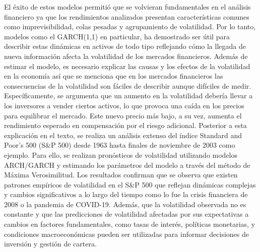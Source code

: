 \documentclass{article}
\theoremstyle{remark}
\theoremstyle{definition}
\begin{document}
\begin{enumerate}[label = \emph{\alph*})]
\begin{tcolorbox}[title=Soluci\'on 1.a]
            El éxito de estos modelos permitió que se volvieran fundamentales en el análisis financiero ya que los rendimientos analizados presentan características comunes como imprevisibilidad, colas pesadas y agrupamiento de volatilidad. Por lo tanto, modelos como el GARCH(1,1) en particular, ha demostrado ser útil para describir estas dinámicas en activos de todo tipo reflejando cómo la llegada de nueva información afecta la volatilidad de los mercados financieros. Además de estimar el modelo, es necesario explicar las causas y los efectos de la volatilidad en la economía así que se menciona que en los mercados financieros las consecuencias de la volatilidad son fáciles de describir aunque difíciles de medir. Específicamente, se argumenta que un aumento en la volatilidad debería llevar a los inversores a vender ciertos activos, lo que provoca una caída en los precios para equilibrar el mercado. Este nuevo precio más bajo, a su vez, aumenta el rendimiento esperado en compensación por el riesgo adicional. Posterior a esta explicación en el texto, se realiza un análisis extenso del índice Standard and Poor's 500 (S\&P 500) desde 1963 hasta finales de noviembre de 2003 como ejemplo. Para ello, se realizan pronósticos de volatilidad utilizando modelos ARCH/GARCH y estimando los parámetros del modelo a través del método de Máxima Verosimilitud. Los resultados confirman que se observa que existen patrones empíricos de volatilidad en el S\&P 500 que reflejan dinámicas complejas y cambios significativos a lo largo del tiempo como lo fue la crisis financiera de 2008 o la pandemia de COVID-19. Además, que la volatilidad observada no es constante y que las predicciones de volatilidad afectadas por sus expectativas a cambios en factores fundamentales, como tasas de interés, políticas monetarias, y condiciones macroeconómicas pueden ser utilizadas para informar decisiones de inversión y gestión de cartera. 

\end{tcolorbox}
\end{enumerate}
\end{document}
